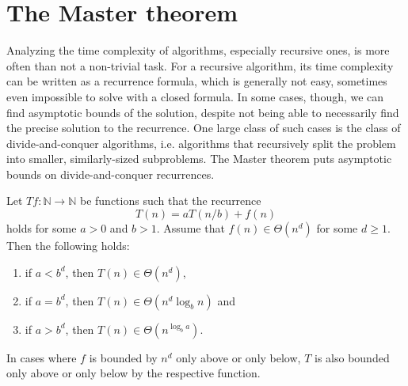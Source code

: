 \section{The Master theorem}

Analyzing the time complexity of algorithms, especially recursive ones, is more often 
than not a non-trivial task. For a recursive algorithm, its time complexity can be 
written as a recurrence formula, which is generally not easy, sometimes even impossible 
to solve with a closed formula. In some cases, though, we can find asymptotic bounds 
of the solution, despite not being able to necessarily find the 
precise solution to the recurrence. One large class of such cases is the class of 
divide-and-conquer algorithms, i.e. algorithms that recursively split the
problem into smaller, similarly-sized subproblems. The Master theorem puts asymptotic 
bounds on divide-and-conquer recurrences.

\begin{theorem}
    Let $T f : \mathbb{N} \rightarrow \mathbb{N}$ be functions such that the recurrence
    \[
        T(n) = a T(n/b) + f(n)
    \]
    holds for some $a > 0$ and $b > 1$. Assume that $f(n) \in \Theta(n^d)$ for some $d \ge 1$. 
    Then the following holds:
    \begin{enumerate}
        \item if $a < b^d$, then $T(n) \in \Theta(n^d)$,
        \item if $a = b^d$, then $T(n) \in \Theta(n^d \log_b{n})$ and
        \item if $a > b^d$, then $T(n) \in \Theta(n^{\log_b{a}})$.
    \end{enumerate}
    In cases where $f$ is bounded by $n^d$ only above or only below,
    $T$ is also bounded only above or only below by the respective function.
\end{theorem}

